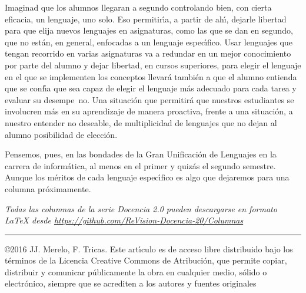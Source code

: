 \documentclass[twoside,10pt]{article}
\newcommand{\surl}[1]{{\small\url{#1}}}
\newcounter{vol}
\begin{document}
\begin{multicols}{2}
Imaginad que los alumnos llegaran a segundo controlando bien, con cierta
eficacia, un lenguaje, uno solo. Eso permitir\'{\i}a, a partir de ah\'{\i},
dejarle libertad para que elija nuevos lenguajes en asignaturas, como
las que se dan en segundo, que no est\'an, en general, enfocadas a un
lenguaje espec\'{\i}fico. Usar lenguajes que tengan recorrido en varias
asignaturas va a redundar en un mejor conocimiento por parte del alumno y
dejar libertad, en cursos superiores, para elegir el lenguaje en el
que se implementen los conceptos llevar\'a tambi\'en a que el alumno
entienda que se conf\'{\i}a que sea capaz de elegir el lenguaje m\'as
adecuado para cada tarea y evaluar su desempe~no. Una situaci\'on que
permitir\'a que nuestros estudiantes se involucren m\'as en su aprendizaje
de manera proactiva, frente a una situaci\'on, a nuestro entender no
deseable, de multiplicidad de lenguajes que no dejan al alumno posibilidad
de elecci\'on.

Pensemos, pues, en las bondades de la Gran Unificaci\'on de Lenguajes en
la carrera de inform\'atica, al menos en el primer y quiz\'as el segundo
semestre. 
Aunque los m\'eritos de cada lenguaje espec\'{\i}fico es algo que
dejaremos para una columna pr\'oximamente. 

\noindent  
\bigskip

\noindent\emph{Todas las columnas de la serie Docencia 2.0
pueden descargarse en formato LaTeX desde
\surl{https://github.com/ReVision-Docencia-20/Columnas}}

\noindent\rule{90mm}{1pt}

{\small \noindent\copyright 2016 JJ. Merelo, F. Tricas. Este art\'{\i}culo es de acceso libre distribuido bajo los t\'{e}rminos
de la Licencia Creative Commons de Atribuci\'{o}n, que permite copiar,
distribuir y comunicar p\'{u}blicamente la obra en cualquier medio, s\'{o}lido
o electr\'{o}nico, siempre que se acrediten a los autores y fuentes
originales}

\end{multicols}
\end{document}
